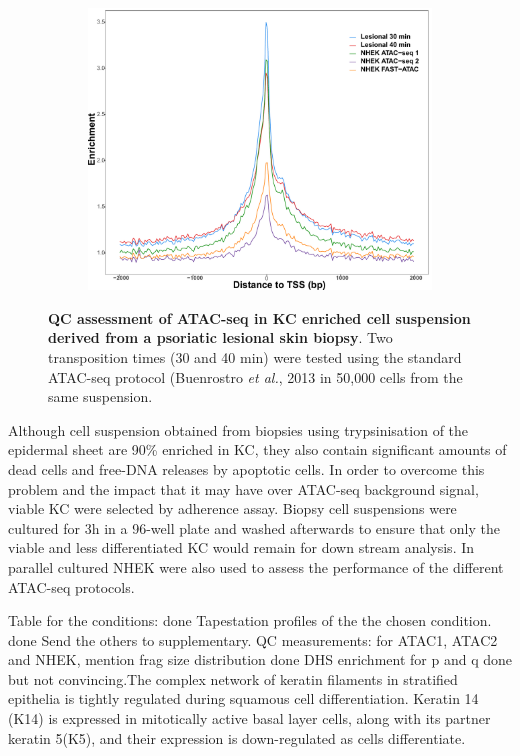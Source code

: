 \begin{figure}[htbp]
\begin{subfigure}{0.45\textwidth}
\includegraphics[width=\textwidth]{./Results1/pdfs/ATAC_skin_TSS_enrichment_PS02_30_40min_NHEK_ATAC1_ATAC_2_FAST_ATAC}
\caption{\textbf{}} %
\end{subfigure}
\caption[QC assessment of ATAC-seq in KC enriched cell suspension derived from a psoriatic lesional skin biopsy]{\textbf{QC assessment of ATAC-seq in KC enriched cell suspension derived from a psoriatic lesional skin biopsy}. Two transposition times (30 and 40 min) were tested using the standard ATAC-seq protocol (Buenrostro \textit{et al.}, 2013 in 50,000 cells from the same suspension.}
\label{fig:PS02_skin_ATAC_QC_assessment}
\end{figure} 




Although cell suspension obtained from biopsies using trypsinisation of the epidermal sheet are 90\% enriched in KC, they also contain significant amounts of dead cells and free-DNA releases by apoptotic cells. In order to overcome this problem and the impact that it may have over ATAC-seq background signal, viable KC were selected by adherence assay. Biopsy cell suspensions were cultured for 3h in a 96-well plate and washed afterwards to ensure that only the viable and less differentiated KC would remain for down stream analysis. In parallel cultured NHEK were also used to assess the performance of the different ATAC-seq protocols.

Table for the conditions: done
Tapestation profiles of the the chosen condition. done Send the others to supplementary.
QC measurements: for ATAC1, ATAC2 and NHEK, mention frag size distribution done
DHS enrichment for p and q done but not convincing.The complex network of keratin filaments in stratified epithelia is tightly regulated during squamous cell differentiation. Keratin 14 (K14) is expressed in mitotically active basal layer cells, along with its partner keratin 5(K5), and their expression is down-regulated as cells differentiate.


